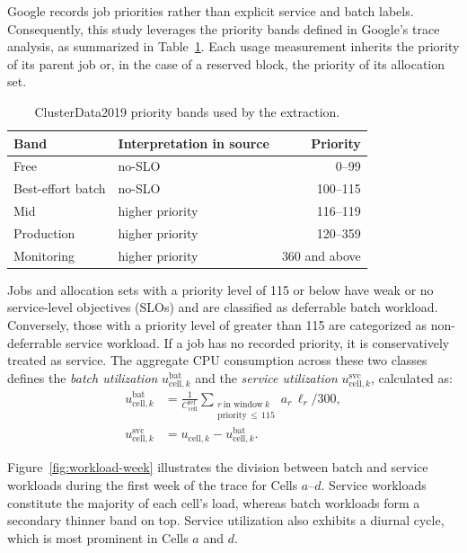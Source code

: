 \documentclass{UNCC-thesis}
\begin{document}
Google records job priorities rather than explicit service and batch
labels. Consequently, this study leverages the priority bands defined in
Google's trace analysis, as summarized in Table~\ref{tab:priority-bands}. Each
usage measurement inherits the priority of its parent job or, in the case of a
reserved block, the priority of its allocation set.

\begin{table}[htbp]
  \centering
  \footnotesize
  \caption[ClusterData2019 priority bands]{ClusterData2019 priority bands used by the extraction.}
  \label{tab:priority-bands}
  \begin{tabular}{@{}llr@{}}
    \toprule
    Band & Interpretation in source & Priority \\
    \midrule
    Free & no-SLO & 0--99 \\
    Best-effort batch & no-SLO & 100--115 \\
    Mid & higher priority & 116--119 \\
    Production & higher priority & 120--359 \\
    Monitoring & higher priority & 360 and above \\
    \bottomrule
  \end{tabular}
\end{table}

Jobs and allocation sets with a priority level of 115 or below have weak or no
service-level objectives (SLOs) and are classified as deferrable batch workload.
Conversely, those with a priority level of greater than 115 are categorized as
non-deferrable service workload. If a job has no recorded priority, it is
conservatively treated as service. The aggregate CPU consumption across these
two classes defines the \emph{batch utilization}
\(u^{\mathrm{bat}}_{\mathrm{cell},k}\) and the \emph{service utilization}
\(u^{\mathrm{svc}}_{\mathrm{cell},k}\), calculated as:
\begin{align}
  u^{\mathrm{bat}}_{\mathrm{cell},k}
  &=
  \frac{1}{C^{\mathrm{ref}}_{\mathrm{cell}}}
  \sum_{\substack{r\ \text{in window}\ k\\ \text{priority}\,\leq\,115}} a_r\,\ell_r/300,
  \label{eq:batch-utilization}\\
  u^{\mathrm{svc}}_{\mathrm{cell},k}
  &=
  u_{\mathrm{cell},k}-u^{\mathrm{bat}}_{\mathrm{cell},k}.
  \label{eq:service-utilization}
\end{align}

Figure~\ref{fig:workload-week} illustrates the division between batch and
service workloads during the first week of the trace for Cells
\(a\)--\(d\). Service workloads constitute the majority of each cell's
load, whereas batch workloads form a secondary thinner band on top. Service
utilization also exhibits a diurnal cycle, which is most prominent in Cells
\(a\) and \(d\).
\end{document}
